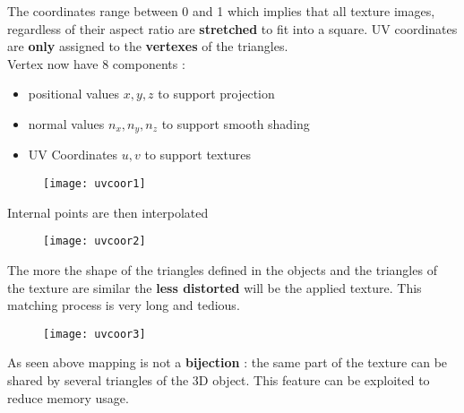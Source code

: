 The coordinates range between 0 and 1 which implies that all texture images, regardless of their aspect ratio are \textbf{stretched} to fit into a square.
UV coordinates are \textbf{only} assigned to the \textbf{vertexes} of the triangles.
\\Vertex now have 8 components : 
\begin{itemize}
\item positional values $x,y,z$ to support projection
\item normal values $n_x,n_y,n_z$ to support smooth shading
\item UV Coordinates $u,v$ to support textures
\end{itemize}
\begin{figure}[H]
  \centering
  \texttt{[image: uvcoor1]}
\end{figure}
Internal points are then interpolated
\begin{figure}[H]
  \centering
  \texttt{[image: uvcoor2]}
\end{figure}
The more the shape  of the triangles defined in the objects and the triangles of the texture are similar the \textbf{less distorted} will be the applied texture. This matching process is very long and tedious.
\begin{figure}[H]
  \centering
  \texttt{[image: uvcoor3]}
\end{figure}
As seen above mapping is not a \textbf{bijection} : the same part  of the texture can be shared by several triangles of the 3D object. This feature can be exploited to reduce memory usage.
\newpage
